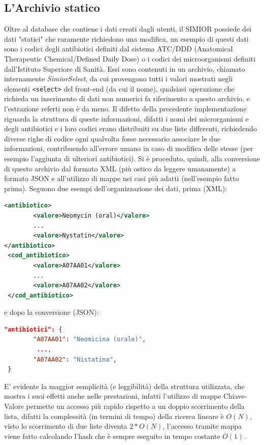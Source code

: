 \subsection{L'Archivio statico}
Oltre al database che contiene i dati creati dagli utenti, il SIMIOR possiede dei dati "statici" che raramente richiedono una modifica, un esempio di questi dati sono i codici degli antibiotici definiti dal sistema ATC/DDD (Anatomical Therapeutic Chemical/Defined Daily Dose) o i codici dei microorganismi definiti dall'Istituto Superiore di Sanità.
Essi sono contenuti in un archivio, chiamato internamente \textit{SimiorSelect}, da cui provengono tutti i valori mostrati negli elementi \texttt{<select>} del front-end (da cui il nome), qualsiasi operazione che richieda un inserimento di dati non numerici fa riferimento a questo archivio, e l'estrazione referti non è da meno. Il difetto della precedente implementazione riguarda la struttura di queste informazioni, difatti i nomi dei microrganismi e degli antibiotici e i loro codici erano distribuiti su due liste differenti, richiedendo diverse righe di codice ogni qualvolta fosse necessario associare le due informazioni, contribuendo all'errore umano in caso di modifica delle stesse (per esempio l'aggiunta di ulteriori antibiotici).
Si è proceduto, quindi, alla conversione di questo archivio dal formato XML (più ostico da leggere umanamente) a formato JSON e all'utilizzo di mappe nei casi più adatti (nell'esempio fatto prima). Seguono due esempi dell'organizzazione dei dati, prima (XML):
\begin{lstlisting}[language=xml]
<antibiotico>
        <valore>Neomycin (oral)</valore>
        ...
        <valore>Nystatin</valore>
</antibiotico>
 <cod_antibiotico>
        <valore>A07AA01</valore>
        ...
        <valore>A07AA02</valore>
 </cod_antibiotico>
\end{lstlisting}
e dopo la conversione (JSON):
\begin{lstlisting}[language=json]
  "antibiotici": {
        "A07AA01": "Neomicina (orale)",
         ...,
        "A07AA02": "Nistatina",
 }
\end{lstlisting}
E' evidente la maggior semplicità (e leggibilità) della struttura utilizzata, che mostra i suoi effetti anche nelle prestazioni, infatti l'utilizzo di mappe Chiave-Valore permette un accesso più rapido rispetto a un doppio scorrimento della lista, difatti la complessità (in termini di tempo) della ricerca lineare è $O(N)$, visto lo scorrimento di due liste diventa $2*O(N)$, l'accesso tramite mappa viene fatto calcolando l'hash che è sempre eseguito in tempo costante $O(1)$.
